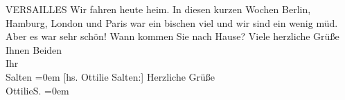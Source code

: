 \begin{ledgroupsized}[t]{13cm}
{{                        VERSAILLES}}\pend
           \pstart
           {\pb}Wir fahren heute heim. In
               diesen kurzen Wochen Berlin, Hamburg, London und Paris war ein bischen viel und wir sind ein wenig müd. Aber es
               war sehr schön! Wann kommen Sie nach Hause?\pend
           \pstart
           Viele herzliche Grüße Ihnen Beiden {\\[\baselineskip]}Ihr {\\[\baselineskip]}\spacefill\mbox{Salten}\pend
           \leftskip=0em{}\pstart
           {[}hs. Ottilie Salten:{]} Herzliche Grüße {\\[\baselineskip]}\spacefill\mbox{OttilieS.}\pend
           \leftskip=0em{}
         
         \endnumbering{}\end{ledgroupsized}\begin{anhang}\end{anhang}\newcommand{\dateiname}{L03564}\newcommand{\titel}{Felix und Ottilie Salten an Arthur und Olga Schnitzler, 25. 6. 1914}\newcommand{\editorInnen}{Martin Anton Müller und Laura Untner}
      